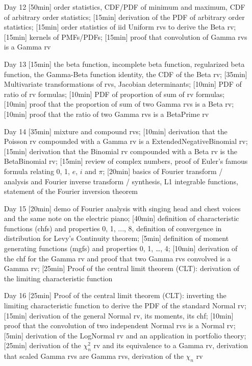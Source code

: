 \begin{enumerate}
\item[Day 12] [50min] order statistics, CDF/PDF of minimum and maximum, CDF of arbitrary order statistics; [15min] derivation of the PDF of arbitrary order statistics; [15min] order statistics of iid Uniform rvs to derive the Beta rv; [15min] kernels of PMFs/PDFs; [15min] proof that convolution of Gamma rvs is a Gamma rv

\item[Day 13]  [15min] the beta function, incomplete beta function, regularized beta function, the Gamma-Beta function identity, the CDF of the Beta rv; [35min] Multivariate transformations of rvs, Jacobian determinants; [10min] PDF of ratio of rv formulas; [10min] PDF of proportion of sum of rv formulas; [10min] proof that the proportion of sum of two Gamma rvs is a Beta rv; [10min] proof that the ratio of two Gamma rvs is a BetaPrime rv

\item[Day 14]  [35min] mixture and compound rvs; [10min] derivation that the Poisson rv compounded with a Gamma rv is a ExtendedNegativeBinomial rv; [15min] derivation that the Binomial rv compounded with a Beta rv is the BetaBinomial rv; [15min] review of complex numbers, proof of Euler's famous formula relating 0, 1, $e$, $i$ and $\pi$; [20min] basics of Fourier transform / analysis and Fourier inverse transform / synthesis, L1 integrable functions, statement of the Fourier inversion theorem

\item[Day 15] [20min] demo of Fourier analysis with singing head and chest voices and the same note on the electric piano; [40min] definition of characteristic functions (chfs) and properties 0, 1, ..., 8, definition of convergence in distribution for Levy's Continuity theorem; [5min] definition of moment generating functions (mgfs) and properties 0, 1, \ldots, 4; [10min] derivation of the chf for the Gamma rv and proof that two Gamma rvs convolved is a Gamma rv; [25min] Proof of the central limit theorem (CLT): derivation of the limiting characteristic function
 

\item[Day 16] [25min] Proof of the central limit theorem (CLT): inverting the limiting characteristic function to derive the PDF of the standard Normal rv; [15min] derivation of the general Normal rv, its moments, its chf; [10min] proof that the convolution of two independent Normal rvs is a Normal rv; [5min] derivation of the LogNormal rv and an application in portfolio theory; [25min] derivation of the $\chi^2_n$ rv and its equivalence to a Gamma rv, derivation that scaled Gamma rvs are Gamma rvs, derivation of the $\chi_n$ rv


\end{enumerate}
